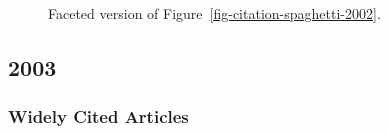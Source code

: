 \documentclass[
  10pt,
  letterpaper,
  DIV=11,
  numbers=noendperiod,
  twoside]{scrartcl}
\begin{document}
\begin{figure}


\caption{\label{fig-citation-facet-2002}Faceted version of
Figure~\ref{fig-citation-spaghetti-2002}.}

\end{figure}%

\newpage

\subsection{2003}\label{sec-s2003}

\subsubsection*{Widely Cited Articles}\label{widely-cited-articles-47}
\end{document}
